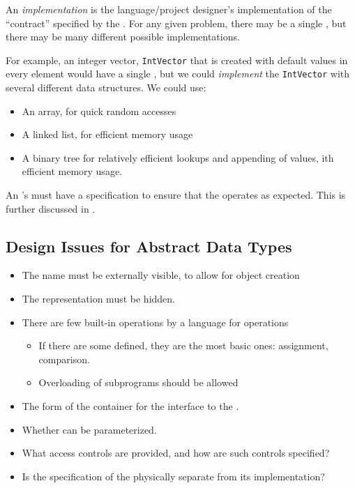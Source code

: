 \begin{definition}[Implementation]\label{def:ADT_Implementation}
  An \emph{implementation} is the language/project designer's implementation of the ``contract'' specified by the .
  For any given problem, there may be a single , but there may be many different possible implementations.

  For example, an integer vector, \texttt{IntVector} that is created with default values in every element would have a single , but we could \emph{implement} the \texttt{IntVector} with several different data structures.
  We could use:
  \begin{itemize}[noitemsep]
  \item An array, for quick random accesses
  \item A linked list, for efficient memory usage
  \item A binary tree for relatively efficient lookups and appending of values, ith efficient memory usage.
  \end{itemize}

  \begin{remark}\label{rmk:ADT_Implementation_Specification}
    An 's  must have a specification to ensure that the  operates as expected.
    This is further discussed in .
  \end{remark}
\end{definition}

\subsection{Design Issues for Abstract Data Types}\label{subsec:Abstract_Data_Type_Design_Issues}
\begin{itemize}[noitemsep]
\item The  name must be externally visible, to allow for object creation
\item The  representation must be hidden.
\item There are few built-in operations by a language for  operations
  \begin{itemize}[noitemsep]
  \item If there are some defined, they are the most basic ones: assignment, comparison.
  \item Overloading of subprograms should be allowed
  \end{itemize}
\item The form of the container for the interface to the .
\item Whether  can be parameterized.
\item What access controls are provided, and how are such controls specified?
\item Is the specification of the  physically separate from its implementation?
\end{itemize}

